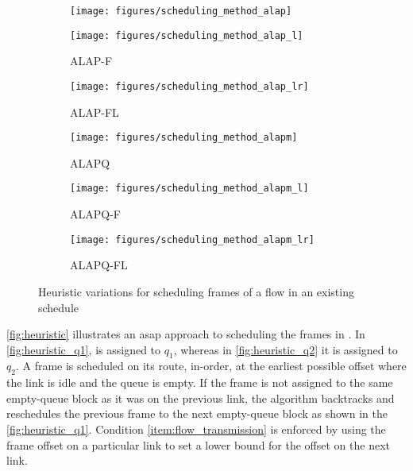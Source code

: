 \begin{figure*}[t]
	\begin{subfigure}{0.30\textwidth}
      \centering
	   \texttt{[image: figures/scheduling\_method\_alap]}
      \vspace{-0.6cm}
	   \caption{}
      \vspace{0.2cm}
      \label{fig:alap}
	\end{subfigure}
	\begin{subfigure}{0.30\textwidth}
      \centering
	   \texttt{[image: figures/scheduling\_method\_alap\_l]}
      \vspace{-0.6cm}
	   \caption{ALAP-F}
      \vspace{0.2cm}
      \label{fig:alap_l}
	\end{subfigure}
	\begin{subfigure}{0.30\textwidth}
      \centering
	   \texttt{[image: figures/scheduling\_method\_alap\_lr]}
      \vspace{-0.6cm}
	   \caption{ALAP-FL}
      \vspace{0.2cm}
      \label{fig:alap_lf}
	\end{subfigure}
	\begin{subfigure}{0.30\textwidth}
      \centering
	   \texttt{[image: figures/scheduling\_method\_alapm]}
      \vspace{-0.6cm}
	   \caption{ALAPQ}
      \label{fig:alapq}
	\end{subfigure}
	\begin{subfigure}{00.30\textwidth}
      \centering
	   \texttt{[image: figures/scheduling\_method\_alapm\_l]}
      \vspace{-0.6cm}
	   \caption{ALAPQ-F}
      \label{fig:alapq_l}
	\end{subfigure}
	\begin{subfigure}{0.30\textwidth}
      \centering
	   \texttt{[image: figures/scheduling\_method\_alapm\_lr]}
      \vspace{-0.6cm}
	   \caption{ALAPQ-FL}
      \label{fig:alapq_lf}
	\end{subfigure}
	\caption{Heuristic variations for scheduling frames of a flow in an existing schedule}
	\label{fig:heuristic_variations}
\vspace{-2ex}
\end{figure*}


\autoref{fig:heuristic} illustrates an \gls{asap} approach to scheduling the frames in \s[2]. In \autoref{fig:heuristic_q1}, \s[2] is assigned to $q_1$, whereas in \autoref{fig:heuristic_q2} it is assigned to $q_2$.
A frame is scheduled on its route, in-order, at the earliest possible offset where the link is idle and the queue is empty. If the frame is not assigned to the same empty-queue block as it was on the previous link, the algorithm backtracks and reschedules the previous frame to the next empty-queue block as shown in the \autoref{fig:heuristic_q1}. Condition \ref{item:flow_transmission} is enforced by using the frame offset on a particular link to set a lower bound for the offset on the next link.

